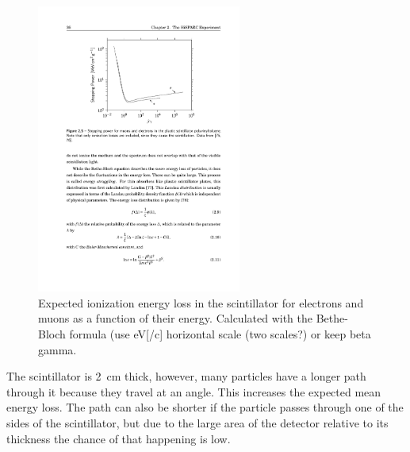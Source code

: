 \begin{figure}
    \centering
    \includegraphics[width=0.6\textwidth]
                    {plots/station/bethe-bloch}
    \caption{Expected ionization energy loss in the scintillator for electrons and muons as a function of their energy. Calculated with the Bethe-Bloch formula (use eV[/c] horizontal scale (two scales?) or keep beta gamma.}
    \label{fig:bethe-bloch}
\end{figure}

The scintillator is \SI{2}{\centi\meter} thick, however, many particles have a longer path through it because they travel at an angle. This increases the expected mean energy loss. The path can also be shorter if the particle passes through one of the sides of the scintillator, but due to the large area of the detector relative to its thickness the chance of that happening is low.

